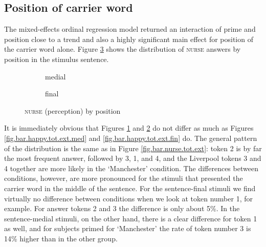 \subsection{Position of carrier word}
\label{sec.perc_res.nurse.position}

The mixed-effects ordinal regression model returned an interaction of prime and position close to a trend and also a highly significant main effect for position of the carrier word alone.
Figure \ref{fig.bar.nurse.tot.ext.pos} shows the distribution of \textsc{nurse} answers by position in the stimulus sentence.

\begin{figure}[h]
	\centering
	\begin{subfigure}{0.49\textwidth}
		\centering
			\resizebox{\linewidth}{!}{} 
		\caption{medial}
		\label{fig.bar.nurse.tot.ext.med}
	\end{subfigure}
	\begin{subfigure}{0.49\textwidth}
		\centering
			\resizebox{\linewidth}{!}{} 
		\caption{final}
		\label{fig.bar.nurse.tot.ext.fin}
	\end{subfigure}
	\caption{\textsc{nurse} (perception) by position}
	\label{fig.bar.nurse.tot.ext.pos}
\end{figure}

It is immediately obvious that Figures \ref{fig.bar.nurse.tot.ext.med} and \ref{fig.bar.nurse.tot.ext.fin} do not differ as much as Figures \ref{fig.bar.happy.tot.ext.med} and \ref{fig.bar.happy.tot.ext.fin} do.
The general pattern of the distribution is the same as in Figure \ref{fig.bar.nurse.tot.ext}: token 2 is by far the most frequent answer, followed by 3, 1, and 4, and the Liverpool tokens 3 and 4 together are more likely in the `Manchester' condition.
The differences between  conditions, however, are more pronounced for the stimuli that presented the carrier word in the middle of the sentence.
For the sentence-final stimuli we find virtually no difference between  conditions when we look at token number 1, for example.
For answer tokens 2 and 3 the difference is only about 5\%.
In the sentence-medial stimuli, on the other hand, there is a clear difference for token 1 as well, and for subjects primed for `Manchester' the rate of token number 3 is 14\% higher than in the other group.

